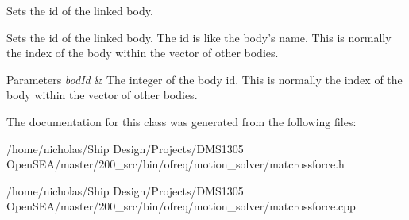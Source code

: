 Sets the id of the linked body. 

Sets the id of the linked body. The id is like the body's name. This is normally the index of the body within the vector of other bodies. 
\begin{DoxyParams}{Parameters}
{\em bod\-Id} & The integer of the body id. This is normally the index of the body within the vector of other bodies. \\
\hline
\end{DoxyParams}


The documentation for this class was generated from the following files\-:\begin{DoxyCompactItemize}
\item 
/home/nicholas/\-Ship Design/\-Projects/\-D\-M\-S1305 Open\-S\-E\-A/master/200\-\_\-src/bin/ofreq/motion\-\_\-solver/matcrossforce.\-h\item 
/home/nicholas/\-Ship Design/\-Projects/\-D\-M\-S1305 Open\-S\-E\-A/master/200\-\_\-src/bin/ofreq/motion\-\_\-solver/matcrossforce.\-cpp\end{DoxyCompactItemize}
